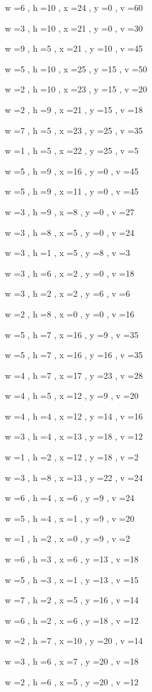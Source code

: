 \documentclass[11pt]{article}
\begin{document}
w =6 , h =10 , x =24 , y =0 , v =60
\par
w =3 , h =10 , x =21 , y =0 , v =30
\par
w =9 , h =5 , x =21 , y =10 , v =45
\par
w =5 , h =10 , x =25 , y =15 , v =50
\par
w =2 , h =10 , x =23 , y =15 , v =20
\par
w =2 , h =9 , x =21 , y =15 , v =18
\par
w =7 , h =5 , x =23 , y =25 , v =35
\par
w =1 , h =5 , x =22 , y =25 , v =5
\par
w =5 , h =9 , x =16 , y =0 , v =45
\par
w =5 , h =9 , x =11 , y =0 , v =45
\par
w =3 , h =9 , x =8 , y =0 , v =27
\par
w =3 , h =8 , x =5 , y =0 , v =24
\par
w =3 , h =1 , x =5 , y =8 , v =3
\par
w =3 , h =6 , x =2 , y =0 , v =18
\par
w =3 , h =2 , x =2 , y =6 , v =6
\par
w =2 , h =8 , x =0 , y =0 , v =16
\par
w =5 , h =7 , x =16 , y =9 , v =35
\par
w =5 , h =7 , x =16 , y =16 , v =35
\par
w =4 , h =7 , x =17 , y =23 , v =28
\par
w =4 , h =5 , x =12 , y =9 , v =20
\par
w =4 , h =4 , x =12 , y =14 , v =16
\par
w =3 , h =4 , x =13 , y =18 , v =12
\par
w =1 , h =2 , x =12 , y =18 , v =2
\par
w =3 , h =8 , x =13 , y =22 , v =24
\par
w =6 , h =4 , x =6 , y =9 , v =24
\par
w =5 , h =4 , x =1 , y =9 , v =20
\par
w =1 , h =2 , x =0 , y =9 , v =2
\par
w =6 , h =3 , x =6 , y =13 , v =18
\par
w =5 , h =3 , x =1 , y =13 , v =15
\par
w =7 , h =2 , x =5 , y =16 , v =14
\par
w =6 , h =2 , x =6 , y =18 , v =12
\par
w =2 , h =7 , x =10 , y =20 , v =14
\par
w =3 , h =6 , x =7 , y =20 , v =18
\par
w =2 , h =6 , x =5 , y =20 , v =12
\par
\newpage
\end{document}
